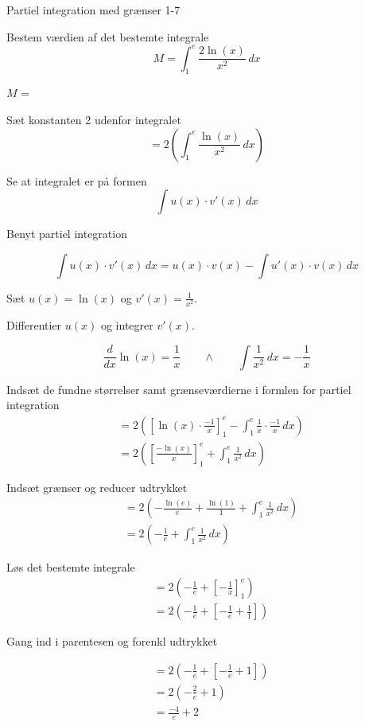 \documentclass{article}
\begin{document}
\newpage

\begin{exercise}{Partiel integration med grænser 1-7}
	
	
	Bestem værdien af det bestemte integrale
	\[
	M = \int_1^e \frac{2 \ln(x)}{x^2}  \, dx
	\]
	
	$M$ =  
	
	\hint
	Sæt konstanten 2 udenfor integralet
	\[
	= 2 \left( \int_1^e \frac{\ln(x)}{x^2}  \, dx	\right)
	\]
	
	\hint
	
	Se at integralet er på formen
	\[
	\int u(x) \cdot v'(x) \, dx
	\]
	
	\hint
	
	Benyt partiel integration
	
	\hint
	\[
	\int u(x) \cdot v'(x)\, dx = u(x) \cdot v(x) - \int u'(x) \cdot v(x) \, dx
	\]
	\hint
	
	Sæt $u(x) = \ln(x)$ og $v'(x) = \frac{1}{x^2}$.
	
	
	\hint
	
	Differentier $u(x)$ og integrer $v'(x)$.
	
	\hint
	\[
	\frac{d}{dx} \ln(x) = \frac{1}{x} \qquad \wedge \qquad \int \frac{1}{x^2} \, dx = - \frac{1}{x}
	\]
	
	\hint
	
	Indsæt de fundne størrelser samt grænseværdierne i formlen for partiel integration 
	\begin{align*}
	&= 2 \left( \left[\ln(x) \cdot \frac{-1}{x} \right]_{1}^{e} - \int_{1}^{e} \frac{1}{x} \cdot \frac{-1}{x} \, dx \right) \\
	&=2 \left( \left[\frac{-\ln(x)}{x} \right]_{1}^{e} + \int_{1}^{e} \frac{1}{x^2} \, dx \right)
	\end{align*}
	
	\hint
	
	Indsæt grænser og reducer udtrykket
	\begin{align*}	
	&= 2 \left( -\frac{\ln(e)}{e} +\frac{\ln(1)}{1}  + \int_{1}^{e} \frac{1}{x^2} \, dx \right) \\
	&=2 \left( -\frac{1}{e}  + \int_{1}^{e} \frac{1}{x^2} \, dx \right)
	\end{align*}
	
	\hint
	Løs det bestemte integrale
	\begin{align*}
	&= 2 \left( -\frac{1}{e}  + \left[- \frac{1}{x}	\right]_1^e	\right)  \\
	&=  2 \left( -\frac{1}{e}  + \left[- \frac{1}{e} + \frac{1}{1}	\right]\right) 
	\end{align*}
	
	\hint
	Gang ind i parentesen og forenkl udtrykket
	
	\hint
	\begin{align*}
	&=  2 \left( -\frac{1}{e}  + \left[- \frac{1}{e} +  1	\right]\right) \\
	&= 2 \left( -\frac{2}{e} +  1\right) \\
	&= \frac{-4}{e} + 2 
	\end{align*}
	
	
	
\end{exercise}
\end{document}
